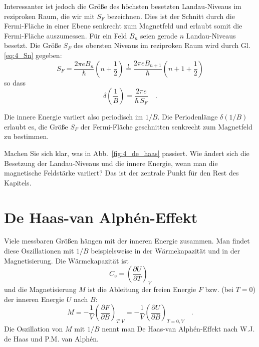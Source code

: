 Interessanter ist jedoch die Größe des höchsten besetzten Landau-Niveaus im reziproken Raum, die wir mit $S_F$ bezeichnen. Dies ist der Schnitt durch die Fermi-Fläche in einer Ebene senkrecht zum Magnetfeld und erlaubt somit die  Fermi-Fläche auszumessen. Für ein Feld $B_n$ seien gerade $n$ Landau-Niveaus besetzt. Die Größe $S_F$ des obersten Niveaus im reziproken Raum wird durch Gl. \ref{eq:4_Sn} gegeben:
\begin{equation}
   S_F =  \frac{2 \pi e B_n}{\hbar} \left( n + \frac{1}{2}\right)  \overset{!}{=} \frac{2 \pi e B_{n+1}}{\hbar} \left( n + 1+ \frac{1}{2}\right)  
\end{equation}
so dass
\begin{equation}
   \delta \left(\frac{1}{B}  \right) = \frac{2 \pi e }{\hbar \, S_F} \quad .
\end{equation}

Die innere Energie variiert also periodisch im $1/B$. Die Periodenlänge $ \delta \left(1/B  \right)$ erlaubt es, die   Größe $S_F$ der Fermi-Fläche geschnitten senkrecht zum Magnetfeld zu bestimmen.

\begin{questions}
   \item Machen Sie sich klar, was in Abb.~\ref{fig:4_de_haas} passiert. Wie ändert sich die Besetzung der Landau-Niveaus und die innere Energie, wenn man die magnetische Feldstärke variiert? Das ist der zentrale Punkt für den Rest des Kapitels.
\end{questions}

\section{De Haas-van Alphén-Effekt}

Viele messbaren Größen hängen mit der  inneren Energie zusammen. Man findet diese Oszillationen mit $1/B$ beispielsweise in der Wärmekapazität  und in der Magnetisierung. Die Wärmekapazität ist
\begin{equation}
   C_v =  \left(\frac{\partial U}{ \partial T} \right)_{V} 
\end{equation}
und die Magnetisierung $M$ ist die Ableitung der freien Energie $F$ bzw. (bei $T=0$) der inneren Energie $U$ nach $B$:
\begin{equation}
   M = - \frac{1}{V} \left(\frac{\partial F}{ \partial B} \right)_{T,V} 
     = - \frac{1}{V} \left(\frac{\partial U}{ \partial B} \right)_{T=0,V} \quad .
\end{equation}
Die Oszillation von $M$ mit $1/B$ nennt man De Haas-van Alphén-Effekt nach W.J. de Haas und P.M. van Alphén.

